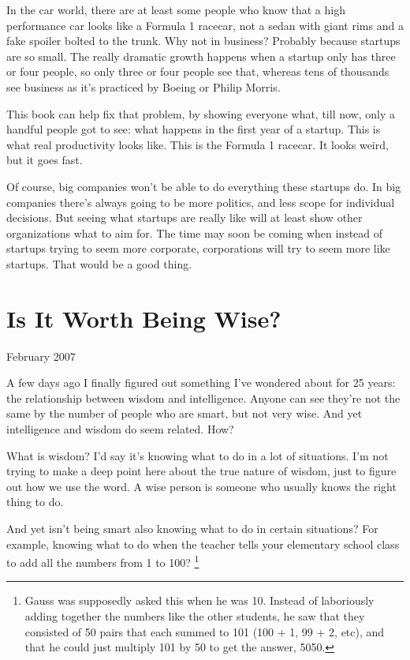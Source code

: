 \documentclass[12pt]{book}
\begin{document}
In the car world, there are at least some people who know that a high
performance car looks like a Formula 1 racecar, not a sedan with giant
rims and a fake spoiler bolted to the trunk. Why not in business?
Probably because startups are so small. The really dramatic growth
happens when a startup only has three or four people, so only three or
four people see that, whereas tens of thousands see business as it's
practiced by Boeing or Philip Morris.

This book can help fix that problem, by showing everyone what, till now,
only a handful people got to see: what happens in the first year of a
startup. This is what real productivity looks like. This is the Formula
1 racecar. It looks weird, but it goes fast.

Of course, big companies won't be able to do everything these startups
do. In big companies there's always going to be more politics, and less
scope for individual decisions. But seeing what startups are really like
will at least show other organizations what to aim for. The time may
soon be coming when instead of startups trying to seem more corporate,
corporations will try to seem more like startups. That would be a good
thing.
\chapter{Is It Worth Being Wise?}

February 2007

A few days ago I finally figured out something I've wondered about for
25 years: the relationship between wisdom and intelligence. Anyone can
see they're not the same by the number of people who are smart, but not
very wise. And yet intelligence and wisdom do seem related. How?

What is wisdom? I'd say it's knowing what to do in a lot of situations.
I'm not trying to make a deep point here about the true nature of
wisdom, just to figure out how we use the word. A wise person is someone
who usually knows the right thing to do.

And yet isn't being smart also knowing what to do in certain situations?
For example, knowing what to do when the teacher tells your elementary
school class to add all the numbers from 1 to 100?
\footnote{Gauss was supposedly asked this when he was 10. Instead of
laboriously adding together the numbers like the other students, he saw
that they consisted of 50 pairs that each summed to 101 (100 + 1, 99 +
2, etc), and that he could just multiply 101 by 50 to get the answer,
5050.}
\end{document}
